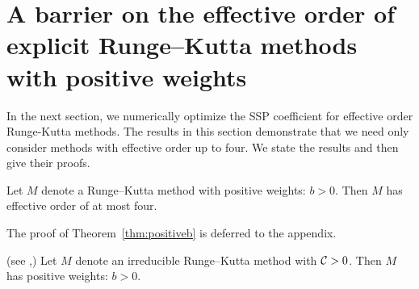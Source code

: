 \section{A barrier on the effective order of explicit Runge--Kutta methods with positive weights}\label{sec:ExRK_barrier}
In the next section, we numerically optimize the SSP coefficient for effective order Runge-Kutta
methods.  The results in this section demonstrate that we need only consider methods with effective
order up to four.  We state the results and then give their proofs.


\begin{theorem}\label{thm:positiveb}
    Let $M$ denote a Runge--Kutta method with positive weights: $b>0$.
    Then $M$ has effective order of at most four.
\end{theorem}
The proof of Theorem~\ref{thm:positiveb} is deferred to the appendix.

\begin{lemma}\label{lem:positiveb}(see \cite[Theorem~4.2]{Kraaijevanger1991},\cite[Lemma 4.2]{Ruuth2002})
Let $M$ denote an irreducible Runge--Kutta method with $\mathcal{C}>0$.  Then $M$ has positive weights:
$b>0$.
\end{lemma}

